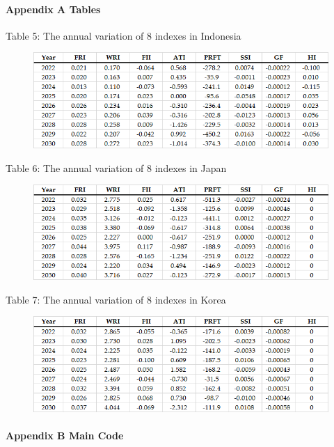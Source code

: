 \documentclass{mcmthesis}
\begin{document}
\begin{appendices}
\paragraph{Appendix A \quad Tables\\[6pt]}

\quad \quad \quad \quad \quad \quad \quad Table 5: The annual variation of 8 indexes in Indonesia                  
\begin{figure}[H]
    \centering
    \includegraphics[width=16cm]{indonesia.png}
\end{figure}

\quad \quad \quad \quad \quad \quad \quad \quad Table 6: The annual variation of 8 indexes in Japan                  
\begin{figure}[H]
    \centering
    \includegraphics[width=16cm]{japan.png}
\end{figure}

\quad \quad \quad \quad \quad \quad \quad \quad Table 7: The annual variation of 8 indexes in Korea                  
\begin{figure}[H]
    \centering
    \includegraphics[width=16cm]{korea.png}
\end{figure}



\paragraph{Appendix B \quad Main Code\\[6pt]}



\end{appendices}
\end{document}
